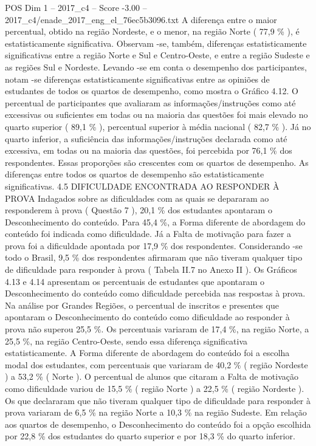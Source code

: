 \begin{textsample}{POS Dim 1 – 2017\_c4 – Score -3.00 – 2017\_c4/enade\_2017\_eng\_el\_76ec5b3096.txt}
A diferença entre o maior percentual, obtido na região Nordeste, e o menor, na região Norte ( 77,9 \% ), é estatisticamente significativa.
Observam -se, também, diferenças estatisticamente significativas entre a região Norte e Sul e Centro-Oeste, e entre a região Sudeste e as regiões Sul e Nordeste.
Levando -se em conta o desempenho dos participantes, notam -se diferenças estatisticamente significativas entre as opiniões de estudantes de todos os quartos de desempenho, como mostra o Gráfico 4.12.
O percentual de participantes que avaliaram as informações/instruções como até excessivas ou suficientes em todas ou na maioria das questões foi mais elevado no quarto superior ( 89,1 \% ), percentual superior à média nacional ( 82,7 \% ).
Já no quarto inferior, a suficiência das informações/instruções declarada como até excessiva, em todas ou na maioria das questões, foi percebida por 76,1 \% dos respondentes.
Essas proporções são crescentes com os quartos de desempenho.
As diferenças entre todos os quartos de desempenho são estatisticamente significativas. 4.5 DIFICULDADE ENCONTRADA AO RESPONDER À PROVA Indagados sobre as dificuldades com as quais se depararam ao responderem à prova ( Questão 7 ), 20,1 \% dos estudantes apontaram o Desconhecimento do conteúdo.
Para 45,4 \%, a Forma diferente de abordagem do conteúdo foi indicada como dificuldade.
Já a Falta de motivação para fazer a prova foi a dificuldade apontada por 17,9 \% dos respondentes.
Considerando -se todo o Brasil, 9,5 \% dos respondentes afirmaram que não tiveram qualquer tipo de dificuldade para responder à prova ( Tabela II.7 no Anexo II ).
Os Gráficos 4.13 e 4.14 apresentam os percentuais de estudantes que apontaram o Desconhecimento do conteúdo como dificuldade percebida nas respostas à prova.
Na análise por Grandes Regiões, o percentual de inscritos e presentes que apontaram o Desconhecimento do conteúdo como dificuldade ao responder à prova não superou 25,5 \%.
Os percentuais variaram de 17,4 \%, na região Norte, a 25,5 \%, na região Centro-Oeste, sendo essa diferença significativa estatisticamente.
A Forma diferente de abordagem do conteúdo foi a escolha modal dos estudantes, com percentuais que variaram de 40,2 \% ( região Nordeste ) a 53,2 \% ( Norte ).
O percentual de alunos que citaram a Falta de motivação como dificuldade variou de 15,5 \% ( região Norte ) a 22,5 \% ( região Nordeste ).
Os que declararam que não tiveram qualquer tipo de dificuldade para responder à prova variaram de 6,5 \% na região Norte a 10,3 \% na região Sudeste.
Em relação aos quartos de desempenho, o Desconhecimento do conteúdo foi a opção escolhida por 22,8 \% dos estudantes do quarto superior e por 18,3 \% do quarto inferior.

\end{textsample}
